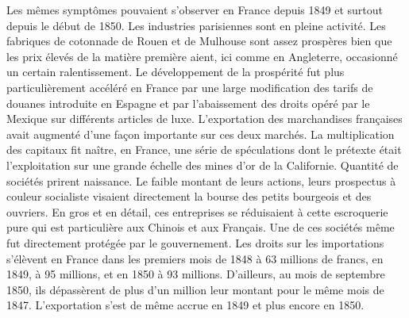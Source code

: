 \documentclass[french,twoside]{book} %
\newcommand\chaptercont{} %
\begin{document}
\chaptercont
\noindent Les mêmes symptômes pouvaient s’observer en France depuis 1849 et surtout depuis le début de 1850. Les industries parisiennes sont en pleine activité. Les fabriques de cotonnade de Rouen et de Mulhouse sont assez prospères bien que les prix élevés de la matière première aient, ici comme en Angleterre, occasionné un certain ralentissement. Le développement de la prospérité fut plus particulièrement accéléré en France par une large modification des tarifs de douanes introduite en Espagne et par l’abaissement des droits opéré par le Mexique sur différents articles de luxe. L’exportation des marchandises françaises avait augmenté d’une façon importante sur ces deux marchés. La multiplication des capitaux fit naître, en France, une série de spéculations dont le prétexte était l’exploitation sur une grande échelle des mines d’or de la Californie. Quantité de sociétés prirent naissance. Le faible montant de leurs actions, leurs prospectus à couleur socialiste visaient directement la bourse des petits bourgeois et des ouvriers. En gros et en détail, ces entreprises se réduisaient à cette escroquerie pure qui est particulière aux Chinois et aux Français. Une de ces sociétés même fut directement protégée par le gouvernement. Les droits sur les importations s’élèvent en France dans les premiers mois de 1848 à 63 millions de francs, en 1849, à 95 millions, et en 1850 à 93 millions. D’ailleurs, au mois de septembre 1850, ils dépassèrent de plus d’un million leur montant pour le même mois de 1847. L’exportation s’est de même accrue en 1849 et plus encore en 1850.\par
\end{document}
